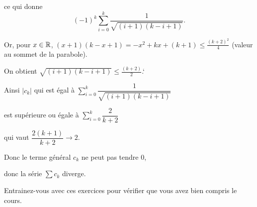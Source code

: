  \change
ce qui donne
$$  (-1)^{k} \sum_{i=0}^k \frac{1}{\sqrt{(i+1)(k-i+1)}}.$$

\change
Or, pour $x\in\mathbb{R}$, $(x+1)(k-x+1)=-x^2+kx+(k+1) \le \frac{(k+2)^2}{4}$ (valeur au sommet de la parabole). 

\change
On obtient $\sqrt{(i+1)(k-i+1)} \le \frac{(k+2)}{2}$.`

\change
Ainsi $|c_k|$ qui est égal à $\displaystyle\sum_{i=0}^k\dfrac{1}{\sqrt{(i+1)(k-i+1)}} $

\change
est supérieure ou égale à 
$\displaystyle\sum_{i=0}^k \dfrac{2}{k+2}$

\change
qui vaut
$ \dfrac{2(k+1)}{k+2} \to 2.$

\change
Donc le terme général $c_k$ ne peut pas tendre $0$, 

\change
donc la série $\sum c_k$ diverge.

\diapo
Entrainez-vous avec ces exercices pour vérifier que vous avez bien compris le cours.



